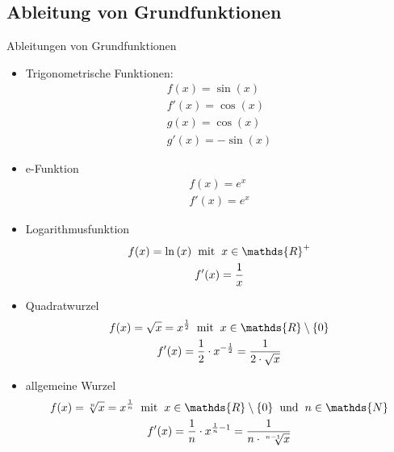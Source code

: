 \subsection{Ableitung von Grundfunktionen}
\begin{merke}{Ableitungen von Grundfunktionen}{}
\begin{itemize}
 \item Trigonometrische Funktionen:
    \begin{gather*} 
	f(x) = \sin({x})  \\
	f'(x) = \cos({x})\\
 g(x) = \cos{(x)}\\
 g'(x) = -\sin{(x)}	\end{gather*}
\item e-Funktion
\begin{gather*} 
	f(x) = e^x  \\
	f'(x) = e^x
	\end{gather*}
 \item Logarithmusfunktion
 \begin{gather*} 
	f(x) = \ln{(x)}   \hspace{0.2cm} \text{mit} \hspace{0.2cm} x\in \mathds{R}^+\\
	f'(x) = \dfrac{1}{x}
	\end{gather*}
 \item Quadratwurzel
 \begin{gather*} 
	f(x) = \sqrt{x} = x^{\frac{1}{2}}   \hspace{0.2cm} \text{mit} \hspace{0.2cm} x\in \mathds{R}\setminus \{0\} \\
 f'(x) = \dfrac{1}{2} \cdot x^{-\frac{1}{2} }= \dfrac{1}{2\cdot \sqrt{x}} 
 \end{gather*}
  \item allgemeine Wurzel
 \begin{gather*} 
	f(x) = \sqrt[n]{x} = x^{\frac{1}{n}}   \hspace{0.2cm} \text{mit} \hspace{0.2cm} x\in \mathds{R}\setminus \{0\}  \hspace{0.2cm} \text{und} \hspace{0.2cm} n\in \mathds{N} \\
 f'(x) = \dfrac{1}{n} \cdot x^{ \frac{1}{n} - 1}= \dfrac{1}{n\cdot \sqrt[n-1]{x}} 
 \end{gather*}
\end{itemize}
\end{merke}
